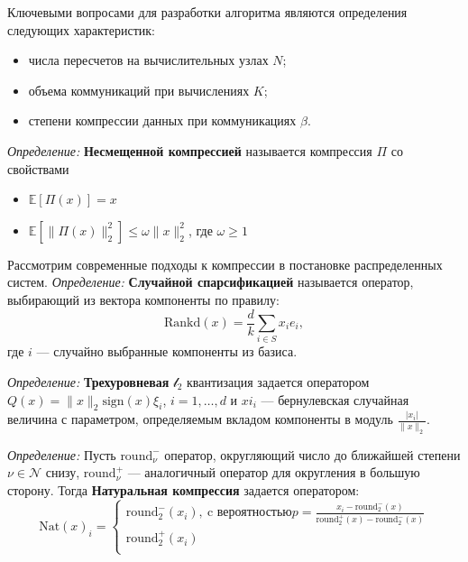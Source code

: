 Ключевыми вопросами для разработки алгоритма являются определения следующих характеристик:
 \begin{itemize}
    \item числа пересчетов на вычислительных узлах $N$;
    \item объема коммуникаций при вычислениях $K$;
    \item степени компрессии данных при коммуникациях $\beta$.
\end{itemize}
    
\textit{Определение:} \textbf{Несмещенной компрессией} называется компрессия $\Pi$ со свойствами 
\begin{itemize}
    \item $\mathbb{E}[\Pi(x)] = x$
    \item $\mathbb{E}[\|\Pi(x)\|^2_2] \le \omega \| x \|^2_2$, где $\omega \ge 1$
\end{itemize}

Рассмотрим современные подходы к компрессии в постановке распределенных систем. 
\textit{Определение:} \textbf{Случайной спарсификацией} \cite{richtarik2016parallel} называется оператор, 
выбирающий из вектора компоненты по правилу:
\begin{equation}
    \text{Rankd}(x) = \frac{d}{k} \sum_{i \in S} x_i e_i,
\end{equation}
где $i$ --- случайно выбранные компоненты из базиса.

\textit{Определение:} \textbf{Трехуровневая} $\mathcal{l}_2$ квантизация задается оператором
$Q(x)=\|x\|_2 \text{sign}(x)\xi_i$, $i=1,\dots,d$  и $xi_i$ --- бернулевская случайная величина с параметром,
определяемым вкладом компоненты в модуль $\frac{|x_i|}{\|x\|_2}$.

\textit{Определение:} Пусть $\text{round}_\nu^-$ оператор, округляющий число до ближайшей степени $\nu \in \mathcal{N}$ снизу, 
$\text{round}_\nu^+$ --- аналогичный оператор для округления в большую сторону. Тогда \textbf{Натуральная компрессия} 
задается оператором:
\begin{equation}
    \text{Nat}(x)_i = \left\{\begin{array}{c}
        \text{round}_2^-(x_i), \ \text{c вероятностью} p=\frac{x_i - \text{round}_2^-(x)}{\text{round}_2^+(x)-\text{round}_2^-(x)} \\
        \text{round}_2^+(x_i) \\
    \end{array}\right.    
\end{equation}

